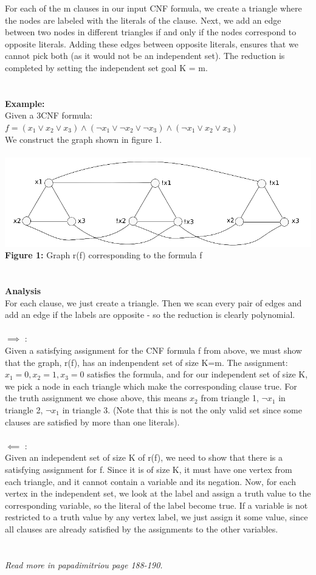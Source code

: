 For each of the m clauses in our input CNF formula, we create a triangle where the nodes are labeled with the literals of the clause. Next, we add an edge between two nodes in different triangles if and only if the nodes correspond to opposite literals. Adding these edges between opposite literals, ensures that we cannot pick both (as it would not be an independent set). The reduction is completed by setting the independent set goal K = m. \\\\\\
\textbf{Example:}\\
Given a 3CNF formula:  $f =  (x_1 \lor x_2 \lor x_3) \land (\lnot x_1 \lor \lnot x_2 \lor \lnot x_3) \land (\lnot x_1 \lor x_2 \lor x_3)$\\
We construct the graph shown in figure 1. \\\\
\includegraphics[scale=0.5]{independentset}
\textbf{Figure 1:} Graph r(f) corresponding to the formula f\\\\\\
\textbf{Analysis}\\
For each clause, we just create a triangle. Then we scan every pair of edges and add an edge if the labels are opposite - so the reduction is clearly polynomial.
\\\\
$\implies$ :\\ Given a satisfying assignment for the CNF formula f from above, we must show that the graph, r(f), has an indenpendent set of size K=m. The assignment: $x_1 = 0, x_2 = 1, x_3 = 0$ satisfies the formula, and for our independent set of size K, we pick a node in each triangle which make the corresponding clause true. For the truth assignment we chose above, this means $x_2$ from triangle 1, $\lnot x_1$ in triangle 2, $\lnot x_1$ in triangle 3. (Note that this is not the only valid set since some clauses are satisfied by more than one literals).
\\\\
$\impliedby$ :\\ Given an independent set of size K of r(f), we need to show that there is a satisfying assignment for f. Since it is of size K, it must have one vertex from each triangle, and it cannot contain a variable and its negation. Now, for each vertex in the independent set, we look at the label and assign a truth value to the corresponding variable, so the literal of the label become true. If a variable is not restricted to a truth value by any vertex label, we just assign it some value, since all clauses are already satisfied by the assignments to the other variables.\\\\\\
\textit{Read more in papadimitriou page 188-190.}
\newpage

